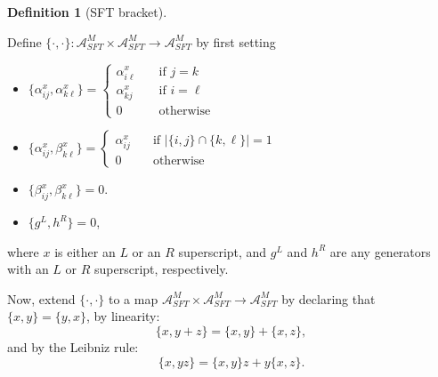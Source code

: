 \documentclass[a4paper,final, reqno]{amsart}
\theoremstyle{plain}
\theoremstyle{definition}
\newtheorem{Def}[Th]{Definition}
\newcommand{\A}{\mathcal{A}}
\begin{document}
	\begin{Def}[SFT bracket] \-\
		
		Define $\{\cdot, \cdot\}: \A^M_{SFT} \times \A^M_{SFT} \to \A^M_{SFT}$ by first setting
		\begin{itemize}
			\item $\{\alpha_{ij}^x, \alpha_{k\ell}^x\} = \begin{cases}
				\alpha_{i\ell}^x & \quad \text{if } j=k \\
				\alpha_{kj}^x & \quad \text{if } i=\ell \\
				0 & \quad \text{otherwise}
			\end{cases}$
			\item $\{\alpha_{ij}^x, \beta_{k\ell}^x\} = \begin{cases}
				\alpha_{ij}^x & \quad \text{if } |\{i,j\} \cap \{k,\ell\}| = 1 \\
				0 & \quad \text{otherwise}
			\end{cases}$
			\item $\{\beta_{ij}^x, \beta_{k\ell}^x\} = 0$.
			\item $\{g^L, h^R\} = 0$,
		\end{itemize}
		where $x$ is either an $L$ or an $R$ superscript, and $g^L$ and $h^R$ are any generators with an $L$ or $R$ superscript, respectively.
		
		
		
		Now, extend $\{\cdot, \cdot\}$ to a map $\A^M_{SFT}\times \A^M_{SFT}\to \A^M_{SFT}$ by declaring that $\{x,y\} = \{y,x\}$, by linearity:
		\[ \{x, y+z\} = \{x,y\} + \{x,z\}, \]
		and by the Leibniz rule:
		\[ \{x,yz\} = \{x,y\}z + y\{x,z\}.\]
		
		
		
	\end{Def}
	
\end{document}

